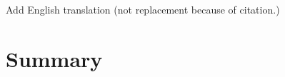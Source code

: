 \begin{remark}
	Add English translation (not replacement because of citation.)
\end{remark}

\section{Summary}
\label{sec:vucaps}
\lipsum[1]